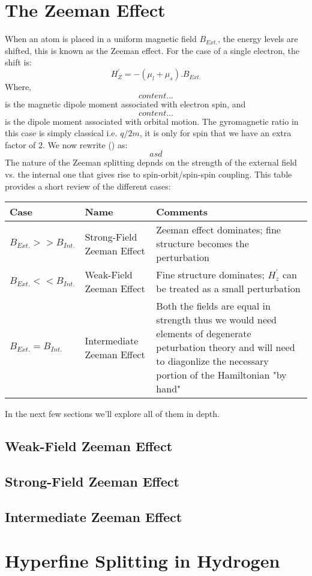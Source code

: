 \section{The Zeeman Effect}
When an atom is placed in a uniform magnetic field $B_{Ext.}$, the energy levels are shifted, this is known as the Zeeman effect. For the case of a single electron, the shift is:
\begin{equation}
H^{'}_{Z} = -(\mu_{l} + \mu_{s}).B_{Ext.}
\end{equation}
Where,
\begin{equation}
content...
\end{equation}
is the magnetic dipole moment associated with electron spin, and
\begin{equation}
	content...
\end{equation}
is the dipole moment associated with orbital motion. The gyromagnetic ratio in this case is simply classical i.e. $q/2m$, it is only for spin that we have an extra factor of 2. We now rewrite () as:
\begin{equation}
asd
\end{equation}
The nature of the Zeeman splitting depnds on the strength of the external field vs. the internal one that gives rise to spin-orbit/spin-spin coupling. This table provides a short review of the different cases:
\begin{center}
\begin{tabularx}{0.9\textwidth} { 
		| >{\centering\arraybackslash}X 
		| >{\centering\arraybackslash}X 
		| >{\centering\arraybackslash}X | }
	\hline
	\textbf{Case} & \textbf{Name} & \textbf{Comments} \\
	\hline
	$B_{Ext.} >> B_{Int.}$  & Strong-Field Zeeman Effect  & Zeeman effect dominates; fine structure becomes the perturbation  \\
	\hline
	$B_{Ext.} << B_{Int.}$  & Weak-Field Zeeman Effect  & Fine structure dominates; $H^{'}_{z}$ can be treated as a small perturbation   \\
	\hline
	$B_{Ext.} = B_{Int.}$  & Intermediate Zeeman Effect  & Both the fields are equal in strength thus we would need elements of degenerate peturbation theory and will need to diagonlize the necessary portion of the Hamiltonian "by hand" \\
	\hline
\end{tabularx}
\end{center}
In the next few sections we'll explore all of them in depth.
\subsection{Weak-Field Zeeman Effect}
\subsection{Strong-Field Zeeman Effect}
\subsection{Intermediate Zeeman Effect}
\section{Hyperfine Splitting in Hydrogen}

